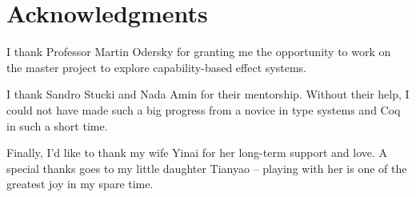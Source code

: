 \section*{\centering Acknowledgments}

I thank Professor Martin Odersky for granting me the opportunity to
work on the master project to explore capability-based effect systems.

I thank Sandro Stucki and Nada Amin for their mentorship. Without
their help, I could not have made such a big progress from a novice in
type systems and Coq in such a short time.

Finally, I'd like to thank my wife Yinai for her long-term support and
love. A special thanks goes to my little daughter Tianyao -- playing
with her is one of the greatest joy in my spare time.

